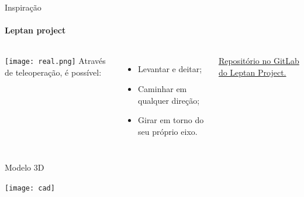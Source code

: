 \begin{frame}[t]{Inspiração}
    \transboxout[duration=0.5]
    \framesubtitle{Leptan project}
    \begin{columns}
            \texttt{[image: real.png]}
            Através de teleoperação, é possível:
            \begin{itemize}
                \item Levantar e deitar;
                \item Caminhar em qualquer direção;
                \item Girar em torno do seu próprio eixo.
                
            \end{itemize}
            \href{https://gitlab.com/Combinatrix/Project_Leptan_Docs/-/tree/master}{Repositório no GitLab do Leptan Project.}
    \end{columns}
   
\end{frame}

\begin{frame}[t]{Modelo 3D}

    \transdissolve[duration=0.5]
    \centering
    \texttt{[image: cad]}

\end{frame}

